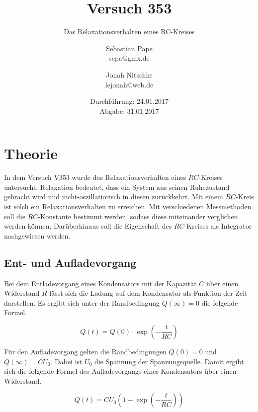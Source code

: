

\title{Versuch 353}
\subtitle{Das Relaxationsverhalten eines RC-Kreises}
\author{Sebastian Pape\\
        sepa@gmx.de \and
        Jonah Nitschke\\
        lejonah@web.de}
\date{Durchführung: 24.01.2017\\
      Abgabe: 31.01.2017}


\maketitle
\setcounter{page}{1}

\section{Theorie}

In dem Versuch V353 wurde das Relaxationsverhalten eines $RC$-Kreises untersucht.
Relaxation bedeutet, dass ein System aus seinen Ruhezustand gebracht wird
und nicht-oszillatiorisch in diesen zurückkehrt.
Mit einem $RC$-Kreis ist solch ein Relaxationsverhalten zu erreichen. Mit verschiedenen
Messmethoden soll die $RC$-Konstante bestimmt werden, sodass diese miteinander
verglichen werden können. Darüberhinaus soll die Eigenschaft des $RC$-Kreises als
Integrator nachgewiesen werden.

\subsection{Ent- und Aufladevorgang}

Bei dem Entladevorgang eines Kondensators mit der Kapazität $C$ über einen Widerstand
$R$ lässt sich die Ladung auf dem Kondensator als Funktion der Zeit darstellen.
Es ergibt sich unter der Randbedingung $Q(\infty) = 0$ die folgende Formel.

\begin{equation}
  \label{eqn:Entladen}
  Q(t) = Q(0)\cdot \exp{(-\frac{t}{RC})}
\end{equation}

Für den Aufladevorgang gelten die Randbedingungen $Q(0) = 0$ und $Q(\infty) = CU_0$. Dabei ist $U_0$ die Spannung der Spannungsquelle. Damit ergibt sich
die folgende Formel des Aufladevorgangs eines Kondensators über einen Widerstand.

\begin{equation}
  \label{eqn:aufladen}
  Q(t) = CU_0(1 - \exp{(-\frac{t}{RC})})
\end{equation}

